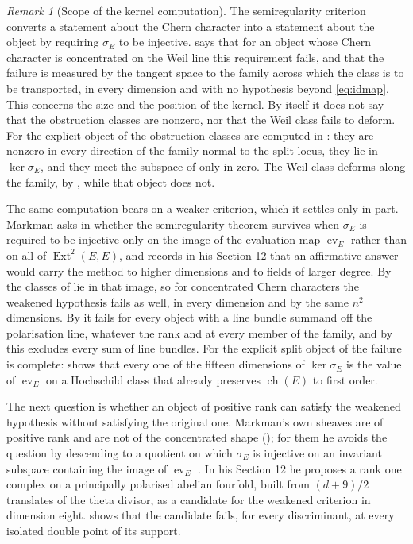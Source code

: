 \documentclass[11pt,reqno]{amsart}
\theoremstyle{plain}
\theoremstyle{definition}
\theoremstyle{remark}
\newtheorem{remark}[theorem]{Remark}
\DeclareMathOperator{\ch}{ch}
\DeclareMathOperator{\Ext}{Ext}
\begin{document}
\begin{remark}[Scope of the kernel computation]
\label{rem:whatmeasures}
The semiregularity criterion converts a statement about the Chern character
into a statement about the object by requiring $\sigma_{E}$ to be injective.
 says that for an object whose Chern character is
concentrated on the Weil line this requirement fails, and that the failure is
measured by the tangent space to the family across which the class is to be
transported, in every dimension and with no hypothesis beyond
\eqref{eq:idmap}. This concerns the size and the position of the kernel. By
itself it does not say that the obstruction classes are nonzero, nor that
the Weil class fails to deform. For the explicit object of
\cite[Proposition~4.14]{paperII} the obstruction classes are computed in
\cite[Proposition~4.16]{paperII}: they are nonzero in every direction of the
family normal to the split locus, they lie in $\ker\sigma_{E}$, and they meet
the subspace of  only in zero. The Weil class deforms
along the family, by , while that object does not.

The same computation bears on a weaker criterion, which it settles only in
part. Markman asks in \cite[Question 11.4]{Mar25b} whether the
semiregularity theorem survives when $\sigma_{E}$ is required to be injective
only on the image of the evaluation map $\operatorname{ev}_{E}$ rather than
on all of $\Ext^{2}(E,E)$, and records in his Section 12 that an affirmative
answer would carry the method to higher dimensions and to fields of larger
degree. By  the classes of  lie in
that image, so for concentrated Chern characters the weakened hypothesis
fails as well, in every dimension and by the same $n^{2}$ dimensions. By
 it fails for every object with a line bundle summand
off the polarisation line, whatever the rank and at every member of the
family, and by \cite[Corollary~4.21]{paperII} this excludes every sum of line bundles.
For the explicit split object of \cite[Proposition~4.14]{paperII} the failure is
complete: \cite[Proposition~4.18]{paperII} shows that every one of the fifteen
dimensions of $\ker\sigma_{E}$ is the value of $\operatorname{ev}_{E}$ on a
Hochschild class that already preserves $\ch(E)$ to first order.

The next question is whether an object of positive rank can satisfy the
weakened hypothesis without satisfying the original one. Markman's own
sheaves are of positive rank and are not of the concentrated shape
(); for them he avoids the question by descending to
a quotient on which $\sigma_{E}$ is injective on an invariant subspace
containing the image of $\operatorname{ev}_{E}$
\cite[Proposition~11.5]{Mar25b}. In his Section 12 he proposes a rank one
complex on a principally polarised abelian fourfold, built from $(d+9)/2$
translates of the theta divisor, as a candidate for the weakened criterion in
dimension eight. \cite[Theorem~4.61]{paperII}
shows that the candidate fails, for every discriminant, at every isolated
double point of its support.


\end{remark}
\end{document}
